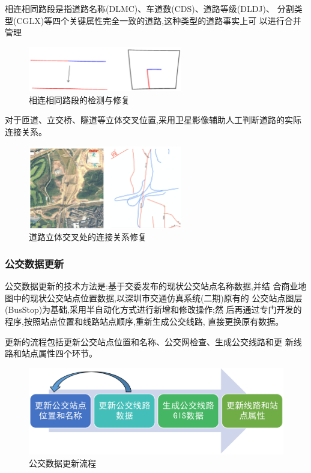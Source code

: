 相连相同路段是指道路名称(DLMC)、车道数(CDS)、道路等级(DLDJ)、
分割类型(CGLX)等四个关键属性完全一致的道路,这种类型的道路事实上可
以进行合并管理

\begin{figure}[!ht]
  \centering
  \includegraphics[width=0.6\textwidth]{figures/chp02_相连相同路段的检测与修复.png}
  \caption{相连相同路段的检测与修复\label{fig:相连相同路段的检测与修复}}
\end{figure}

对于匝道、立交桥、隧道等立体交叉位置,采用卫星影像辅助人工判断道路的实际连接关系。

\begin{figure}[!ht]
  \centering
  \includegraphics[width=0.6\textwidth]{figures/chp02_道路立体交叉处的连接关系修复.png}
  \caption{道路立体交叉处的连接关系修复\label{fig:道路立体交叉处的连接关系修复}}
\end{figure}

\subsubsection{公交数据更新}
公交数据更新的技术方法是:基于交委发布的现状公交站点名称数据,并结
合商业地图中的现状公交站点位置数据,以深圳市交通仿真系统(二期)原有的
公交站点图层(BusStop)为基础,采用半自动化方式进行新增和修改操作;然
后再通过专门开发的程序,按照站点位置和线路站点顺序,重新生成公交线路,
直接更换原有数据。

更新的流程包括更新公交站点位置和名称、公交网检查、生成公交线路和更
新线路和站点属性四个环节。

\begin{figure}[ht]
  \centering
  \includegraphics[width=\textwidth]{figures/chp02_公交数据更新流程.png}
  \caption{公交数据更新流程\label{fig:公交数据更新流程} }
\end{figure}



